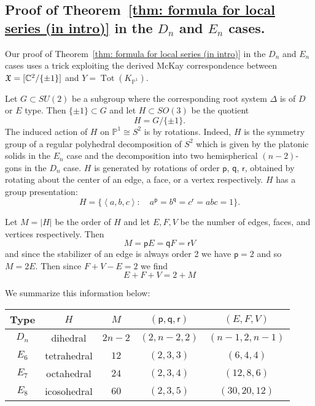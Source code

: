 \documentclass{article}
\theoremstyle{definition}
\newcommand{\CC} {{\mathbb C}}          %
\newcommand{\PP}{\mathbb{P}}
\newcommand{\X}{\frak{X}}
\newcommand{\varp}{\mathsf{p}}
\newcommand{\varq}{\mathsf{q}}
\newcommand{\varr}{\mathsf{r}}
\begin{document}
\subsection{Proof of Theorem~\ref{thm: formula for local series (in
intro)} in the $D_{n}$ and $E_{n}$ cases.}\label{subsec: proof of Dn
and En cases of local series}

Our proof of Theorem~\ref{thm: formula for local series (in intro)} in
the $D_{n}$ and $E_{n}$ cases uses a trick exploiting the derived
McKay correspondence between $\X =[\CC^{2}/\{\pm 1 \}]$ and
$Y=\operatorname{Tot}(K_{\PP^{1}})$. 

Let $G\subset SU(2)$ be a subgroup where the corresponding root system
$\Delta$ is of $D$ or $E$ type. Then $\{\pm 1 \}\subset G$ and let
$H\subset SO(3)$ be the quotient
\[
H=G/\{\pm 1 \}.
\]
The induced action of $H$ on $\PP^{1}\cong S^{2}$ is by
rotations. Indeed, $H$ is the symmetry group of a regular polyhedral
decomposition of $S^{2}$ which is given by the platonic solids in the
$E_{n}$ case and the decomposition into two hemispherical $(n-2)$-gons
in the $D_{n}$ case. $H$ is generated by rotations of order $\varp$,
$\varq$, $\varr$, obtained by rotating about the center of an edge, a
face, or a vertex respectively. $H$ has a group presentation:
\[
H=\{\left\langle a,b,c \right\rangle :\quad a^{\varp} = b^{\varq} =
c^{\varr} = abc=1 \}.
\]

Let $M=|H|$ be the order of $H$ and let $E,F,V$ be the number of
edges, faces, and vertices respectively. Then
\[
M=\varp E = \varq F = \varr V
\]
and since the stabilizer of an edge is always order 2 we have $\varp =2$
and so $M=2E$. Then since $F+V-E=2$ we find
\[
E+F+V = 2 + M
\]

We summarize this information below:

\begin{center}
\begin{tabular}{|c|c|c|c|c|}
\hline
Type &	$H$ &	$M$&	$(\varp ,\varq ,\varr )$ &	$(E,F,V)$\\ \hline \hline 
$D_{n}$     & dihedral & $2n-2$ & $(2,n-2,2)$& $(n-1,2,n-1)$	\\ \hline
$E_{6}$     & tetrahedral & $12$ & $(2,3,3)$& $(6,4,4)$	\\ \hline
$E_{7}$     & octahedral & $24$ & $(2,3,4)$& $(12,8,6)$	\\ \hline
$E_{8}$     & icosohedral & $60$ & $(2,3,5)$& $(30,20,12)$	\\ \hline
\end{tabular}
\end{center}
\end{document}

